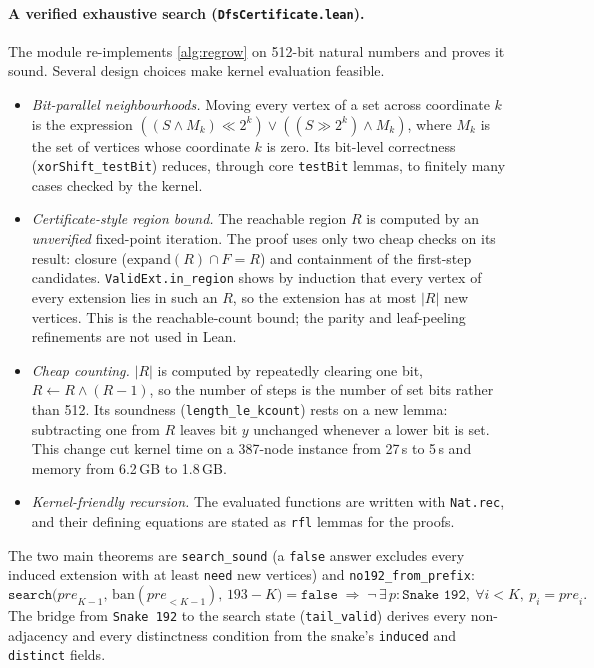 \documentclass[11pt,a4paper]{article}
\theoremstyle{definition}
\begin{document}
\paragraph{A verified exhaustive search (\texttt{DfsCertificate.lean}).} The module re-implements \cref{alg:regrow} on 512-bit natural numbers and proves it sound. Several design choices make kernel evaluation feasible.
\begin{itemize}[leftmargin=*]
\item \emph{Bit-parallel neighbourhoods.} Moving every vertex of a set across coordinate $k$ is the expression $((S\wedge M_k)\ll 2^k)\vee((S\gg 2^k)\wedge M_k)$, where $M_k$ is the set of vertices whose coordinate $k$ is zero. Its bit-level correctness (\texttt{xorShift\_testBit}) reduces, through core \texttt{testBit} lemmas, to finitely many cases checked by the kernel.
\item \emph{Certificate-style region bound.} The reachable region $R$ is computed by an \emph{unverified} fixed-point iteration. The proof uses only two cheap checks on its result: closure ($\mathrm{expand}(R)\cap F=R$) and containment of the first-step candidates. \texttt{ValidExt.in\_region} shows by induction that every vertex of every extension lies in such an $R$, so the extension has at most $|R|$ new vertices. This is the reachable-count bound; the parity and leaf-peeling refinements are not used in Lean.
\item \emph{Cheap counting.} $|R|$ is computed by repeatedly clearing one bit, $R\leftarrow R\wedge(R-1)$, so the number of steps is the number of set bits rather than 512. Its soundness (\texttt{length\_le\_kcount}) rests on a new lemma: subtracting one from $R$ leaves bit $y$ unchanged whenever a lower bit is set. This change cut kernel time on a 387-node instance from 27\,s to 5\,s and memory from 6.2\,GB to 1.8\,GB.
\item \emph{Kernel-friendly recursion.} The evaluated functions are written with \texttt{Nat.rec}, and their defining equations are stated as \texttt{rfl} lemmas for the proofs.
\end{itemize}
The two main theorems are \texttt{search\_sound} (a \texttt{false} answer excludes every induced extension with at least \texttt{need} new vertices) and \texttt{no192\_from\_prefix}:
\[
\texttt{search}\bigl(\mathit{pre}_{K-1},\,\mathrm{ban}(\mathit{pre}_{<K-1}),\,193-K\bigr)=\texttt{false}
\;\Longrightarrow\;
\neg\,\exists\,p:\texttt{Snake 192},\ \forall i<K,\ p_i=\mathit{pre}_i .
\]
The bridge from \texttt{Snake 192} to the search state (\texttt{tail\_valid}) derives every non-adjacency and every distinctness condition from the snake's \texttt{induced} and \texttt{distinct} fields.
\end{document}
